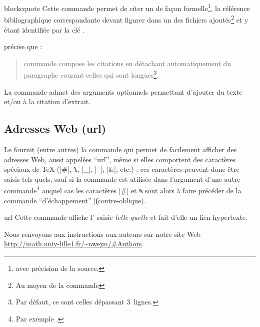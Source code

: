 \documentclass[french,nolocaltoc]{nwejmart}
\newtheorem[title=Fait,style=definition]{fact}
\begin{document}
\begin{docCommand}{blockcquote}{}
  Cette commande permet de citer un  de façon
  formelle\footnote{\Ie*{} avec précision de la source.}, la référence
  bibliographique correspondante devant figurer dans un des fichiers 
  ajoutés\footnote{Au moyen de la commande } et
  y étant identifiée par la clé .

\begin{bodycode}[listing and text,listing options={alsolanguage={[biblatex]TeX},alsolanguage={[csquotes]TeX},deletekeywords={[3]footnote}}]
\citeauthor{Bitouze} précise que :
\blockcquote{Bitouze}{%
   commande compose les citations en détachant
  automatiquement du paragraphe courant celles qui sont
  longues\footnote{Par défaut, ce sont celles
    dépassant 3~lignes.}.%
}.
\end{bodycode}
\end{docCommand}

La commande  admet des arguments optionnels permettant
d'ajouter du texte  et/ou  à la citation
d'extrait\autocite[Pour plus de détails, cf. par exemple][]{Bitouze}.


\subsection{Adresses Web (\texorpdfstring{\acrshort{url}}{URL})}
\label{sec-url}

Le  fournit (entre autres) la commande  qui
permet de facilement afficher des adresses Web, aussi appelées
\enquote{\gls{url}}, même si elles comportent des caractères spéciaux de \TeX{}
(|#|,
%
\lstinline[commentstyle={}]+%+,
%
|_|, |~|, |&|, etc.) : ces caractères peuvent donc être saisis tels quels, sauf
si la commande  est utilisée dans l'argument d'une autre
commande\footnote{Par exemple \protect{}.} auquel cas les
caractères |#| et
%
\lstinline[commentstyle={}]+%+
%
sont alors à faire précéder de la commande \enquote{d'échappement} |\|
(contre-oblique).%

\begin{docCommand}{url}{}
  Cette commande affiche l' saisie \emph{telle quelle} et fait
  d'elle un lien hypertexte.
\begin{bodycode}[listing and text,listing options={alsolanguage={[hyperref]TeX},deletekeywords={[2]url}}]
Nous renvoyons aux instructions aux auteurs sur notre site Web
\url{http://math.univ-lille1.fr/~nwejm/#Authors}.
\end{bodycode}
\end{docCommand}
\end{document}
